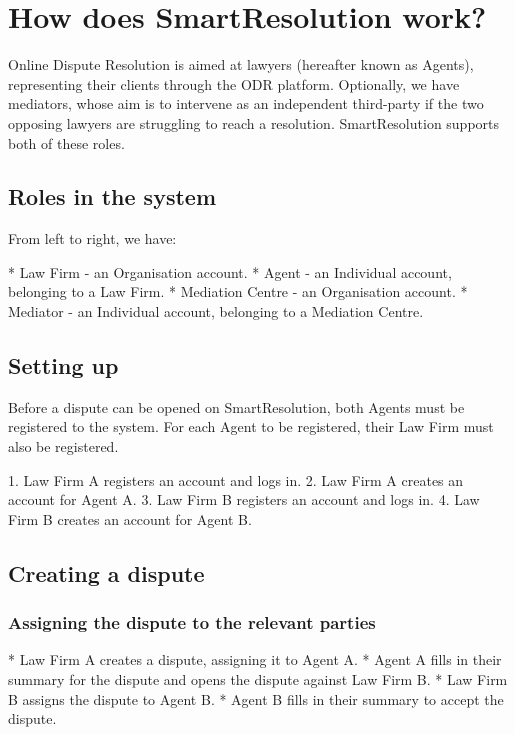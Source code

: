 \chapter{How does SmartResolution work?}\label{appendix:workflow}

Online Dispute Resolution is aimed at lawyers (hereafter known as Agents), representing their clients through the ODR platform. Optionally, we have mediators, whose aim is to intervene as an independent third-party if the two opposing lawyers are struggling to reach a resolution. SmartResolution supports both of these roles.

\section{Roles in the system}


From left to right, we have:

* Law Firm - an Organisation account.
* Agent - an Individual account, belonging to a Law Firm.
* Mediation Centre - an Organisation account.
* Mediator - an Individual account, belonging to a Mediation Centre.

\section{Setting up}

Before a dispute can be opened on SmartResolution, both Agents must be registered to the system. For each Agent to be registered, their Law Firm must also be registered.

1. Law Firm A registers an account and logs in.
2. Law Firm A creates an account for Agent A.
3. Law Firm B registers an account and logs in.
4. Law Firm B creates an account for Agent B.

\section{Creating a dispute}

\subsection{Assigning the dispute to the relevant parties}


* Law Firm A creates a dispute, assigning it to Agent A.
* Agent A fills in their summary for the dispute and opens the dispute against Law Firm B.
* Law Firm B assigns the dispute to Agent B.
* Agent B fills in their summary to accept the dispute.

